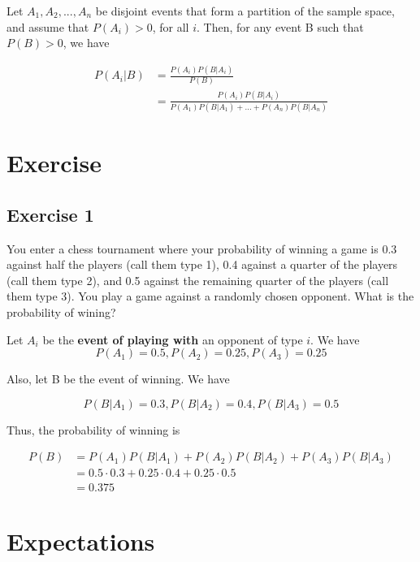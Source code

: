 Let $A_1, A_2, ..., A_n$ be disjoint events that form a partition of the sample space, and assume that $P(A_i) > 0$, for all $i$. Then, for any event B such that $P(B) > 0$, we have

\begin{equation}
    \begin{split}
        P(A_i | B) & = \frac{P(A_i)P(B | A_i)}{P(B)}\\
        & = \frac{P(A_i)P(B | A_i)}{P(A_1)P(B | A_1) + ... + P(A_n)P(B|A_n)}
    \end{split}
\end{equation}

\section{Exercise}

\subsection{Exercise 1}
You enter a chess tournament where your probability of winning a game is $0.3$ against half the players (call them type 1), 0.4 against a quarter of the players (call them type 2), and 0.5 against the remaining quarter of the players (call them type 3). You play a game against a randomly chosen opponent. What is the probability of wining?

Let $A_i$ be the \textbf{event of playing with} an opponent of type $i$. We have
$$
    P(A_1) = 0.5, P(A_2) = 0.25, P(A_3) = 0.25
$$

Also, let B be the event of winning. We have

$$
    P(B | A_1) = 0.3, P(B | A_2) = 0.4, P(B | A_3) = 0.5
$$

Thus, the probability of winning is

\begin{equation}
    \begin{split}
        P(B) & = P(A_1)P(B | A_1) + P(A_2)P(B|A_2) + P(A_3)P(B|A_3)\\
        & = 0.5 \cdot 0.3 + 0.25 \cdot 0.4 + 0.25 \cdot 0.5\\
        & = 0.375
    \end{split}
\end{equation}

\section{Expectations}

